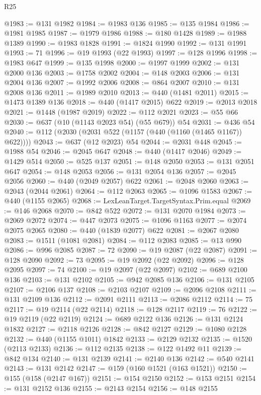 \begin{lexlean}{R25}
\begin{coremodule}
{{{{{{{{{{{{{{{{{{{{{{{{{{{{{{{{{{{{{{{{{{{{{{{{{{{{{{{{{{{{{{{{{{{{{{{{{{{{{{{{{{{{{{{{{{{{{{{{{{{{{{{{{{{{{{{{{{{{{{{{{{{{{{{{{{{{{{{{{{{{{{{{{{{{{{{{{{{{{{{{{{{{{{{{{{{{{{{{{{{{{{{{{{{{{{{{{{{{{{{@1983 := @131 @1982
@1984 := @1983 @136
@1985 := @135 @1984
@1986 := @1981 @1985
@1987 := @1979 @1986
@1988 := @180 @1428
@1989 := @1988 @1389
@1990 := @1983 @1828
@1991 := @1824 @1990
@1992 := @131 @1991
@1993 := 71
@1996 := @19 @1993 (@22 @1993)
@1997 := @128 @1996
@1998 := @1983 @647
@1999 := @135 @1998
@2000 := @1997 @1999
@2002 := @131 @2000 @136
@2003 := @1758 @2002
@2004 := @148 @2003
@2006 := @131 @2004 @136
@2007 := @1992 @2006
@2008 := @864 @2007
@2010 := @131 @2008 @136
@2011 := @1989 @2010
@2013 := @440 (@1481 @2011)
@2015 := @1473 @1389 @136
@2018 := @440 (@1417 @2015) @622
@2019 := @2013 @2018
@2021 := @1448 (@1987 @2019)
@2022 := @112 @2021
@2023 := @55 @66
@2030 := @637 (@10 (@1143 @2023 @54) (@55 @679)) @54
@2031 := @436 @54
@2040 := @112 (@2030 (@2031 @522 (@1157 (@440 (@1160 (@1465 @1167)) @622))))
@2043 := @637 (@12 @2023) @54
@2044 := @2031 @448
@2045 := @1988 @54
@2046 := @2045 @647
@2048 := @440 (@1417 @2046)
@2049 := @1429 @514
@2050 := @525 @137
@2051 := @148 @2050
@2053 := @131 @2051 @647
@2054 := @148 @2053
@2056 := @131 @2054 @136
@2057 := @2045 @2056
@2060 := @440 (@2049 @2057) @622
@2061 := @2048 @2060
@2063 := @2043 (@2044 @2061)
@2064 := @112 @2063
@2065 := @1096 @1583
@2067 := @440 (@1155 @2065)
@2068 := LexLeanTarget.TargetSyntax.Prim.equal
@2069 := @146 @2068
@2070 := @842 @522
@2072 := @131 @2070 @1984
@2073 := @2069 @2072
@2074 := @447 @2073
@2075 := @1096 @1163
@2077 := @2074 @2075 @2065
@2080 := @440 (@1839 @2077) @622
@2081 := @2067 @2080
@2083 := @1511 (@1081 @2081)
@2084 := @112 @2083
@2085 := @13 @990
@2086 := @996 @2085
@2087 := 72
@2090 := @19 @2087 (@22 @2087)
@2091 := @128 @2090
@2092 := 73
@2095 := @19 @2092 (@22 @2092)
@2096 := @128 @2095
@2097 := 74
@2100 := @19 @2097 (@22 @2097)
@2102 := @689 @2100 @136
@2103 := @131 @2102
@2105 := @942 @2085 @136
@2106 := @131 @2105
@2107 := @2106 @137
@2108 := @2103 @2107
@2109 := @2096 @2108
@2111 := @131 @2109 @136
@2112 := @2091 @2111
@2113 := @2086 @2112
@2114 := 75
@2117 := @19 @2114 (@22 @2114)
@2118 := @128 @2117
@2119 := 76
@2122 := @19 @2119 (@22 @2119)
@2124 := @689 @2122 @136
@2126 := @131 @2124 @1832
@2127 := @2118 @2126
@2128 := @842 @2127
@2129 := @1080 @2128
@2132 := @440 (@1155 @1011) @1842
@2133 := @2129 @2132
@2135 := @1520 (@2113 @2133)
@2136 := @112 @2135
@2138 := @122 @1492 @11
@2139 := @842 @134
@2140 := @131 @2139
@2141 := @2140 @136
@2142 := @540 @2141
@2143 := @131 @2142
@2147 := @159 (@160 @1521 (@163 @1521))
@2150 := @155 (@158 (@2147 @167))
@2151 := @154 @2150
@2152 := @153 @2151
@2154 := @131 @2152 @136
@2155 := @2143 @2154
@2156 := @148 @2155
}}}}}}}}}}}}}}}}}}}}}}}}}}}}}}}}}}}}}}}}}}}}}}}}}}}}}}}}}}}}}}}}}}}}}}}}}}}}}}}}}}}}}}}}}}}}}}}}}}}}}}}}}}}}}}}}}}}}}}}}}}}}}}}}}}}}}}}}}}}}}}}}}}}}}}}}}}}}}}}}}}}}}}}}}}}}}}}}}}}}}}}}}}}}}}}}}}}}}}}
\end{coremodule}
\end{lexlean}
